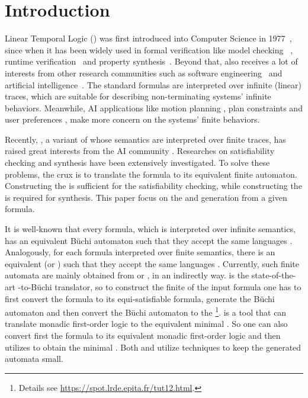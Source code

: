 \section{Introduction}

Linear Temporal Logic (\ltl) was first introduced into Computer Science in 1977~\cite{Pnu77}, since when it has been widely used in formal verification like model checking ~\cite{CGD99}, runtime verification~\cite{BLS11} and property synthesis~\cite{JGWB07,BFJ12}. Beyond that, \ltl also receives a lot of interests from other research communities such as software engineering~\cite{BKMR15} and artificial intelligence~\cite{BK98}. The standard \ltl formulas are interpreted over infinite (linear) traces, which are suitable for describing non-terminating systems' infinite behaviors. Meanwhile, AI applications like motion planning \cite{BK98,DV99,CDV02,PLGG11,CBMM17}, plan constraints \cite{BK00,Gab04} and user preferences \cite{BFM06,BFM11,SBM11}, make more concern on the systems' finite behaviors. 

Recently, \ltlf, a variant of \ltl whose semantics are interpreted over finite traces, has raised great interests from the AI community \cite{GV13,GV15}. Researches on \ltlf satisfiability checking \cite{LZPVH14,LRPZV19} and \ltlf synthesis \cite{GV15} have been extensively investigated. To solve these problems, the crux is to translate the \ltlf formula to its equivalent finite automaton. Constructing the \NFA is sufficient for the satisfiability checking, while constructing the \DFA is required for \ltlf synthesis. This paper focus on the \NFA and \DFA generation from a given \ltlf formula. 

It is well-known that every \ltl formula, which is interpreted over infinite semantics, has an equivalent B\"uchi automaton such that they accept the same languages \cite{GPVW95}. Analogously, for each \ltlf formula interpreted over finite semantics, there is an equivalent \NFA (or \DFA) such that they accept the same languages \cite{GV15}. Currently, such finite automata are mainly obtained from \spot \cite{DP04} or \mona \cite{HJJKPRS95,EKM98}, in an indirectly way. \spot is the state-of-the-art \ltl-to-B\"uchi translator, so to construct the finite \NFA of the input \ltlf formula one has to first convert the \ltlf formula to its equi-satisfiable \ltl formula, generate the B\"uchi automaton and then convert the B\"uchi automaton to the \NFA\footnote{Details see \url{https://spot.lrde.epita.fr/tut12.html}.}. \mona is a tool that can translate monadic first-order logic \cite{Tra62} to the equivalent minimal \DFA. So one can also convert first the \ltlf formula to its equivalent monadic first-order logic and then utilizes \mona to obtain the minimal \DFA \cite{}. Both \spot and \mona utilize \BDD techniques to keep the generated automata small. 

